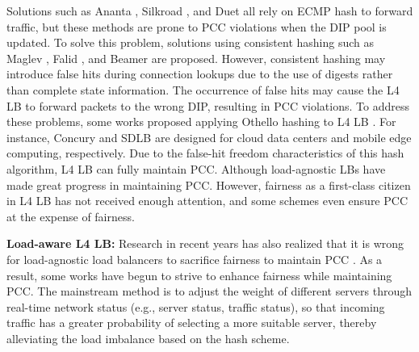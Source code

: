 Solutions such as Ananta \cite{patel2013ananta}, Silkroad \cite{miao2017silkroad}, and Duet \cite{gandhi2014duet} all rely on ECMP hash to forward traffic, but these methods are prone to PCC violations when the DIP pool is updated. To solve this problem, solutions using consistent hashing such as Maglev \cite{eisenbud2016maglev}, Falid \cite{araujo2018balancing}, and Beamer \cite{olteanu2018stateless} are proposed. However, consistent hashing may introduce false hits during connection lookups due to the use of digests rather than complete state information. The occurrence of false hits may cause the L4 LB to forward packets to the wrong DIP, resulting in PCC violations. To address these problems, some works proposed applying Othello hashing to L4 LB \cite{yu2018memory}. For instance, Concury \cite{shi2020concury} and SDLB \cite{yu2017sdlb} are designed for cloud data centers and mobile edge computing, respectively. Due to the false-hit freedom characteristics of this hash algorithm, L4 LB can fully maintain PCC. Although load-agnostic LBs have made great progress in maintaining PCC. However, fairness as a first-class citizen in L4 LB has not received enough attention, and some schemes even ensure PCC at the expense of fairness.

\textbf{Load-aware L4 LB:}
Research in recent years has also realized that it is wrong for load-agnostic load balancers to sacrifice fairness to maintain PCC \cite{zhang2020fast, barbette2021cheetah, yao2022hlb}. As a result, some works have begun to strive to enhance fairness while maintaining PCC. The mainstream method is to adjust the weight of different servers through real-time network status (e.g., server status, traffic status), so that incoming traffic has a greater probability of selecting a more suitable server, thereby alleviating the load imbalance based on the hash scheme.

